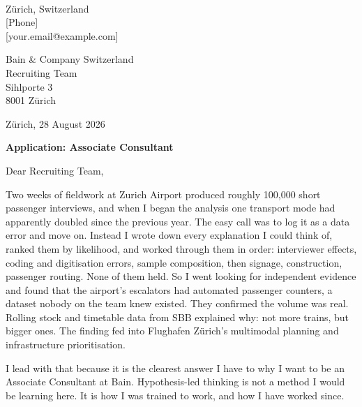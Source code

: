 \documentclass[10.5pt,a4paper]{article}
\begin{document}
\pagestyle{empty}


\begin{flushleft}
[First] [Last]\\
Zürich, Switzerland\\
{[Phone]}\\
{[your.email@example.com]}
\end{flushleft}

\begin{flushright}
Bain \& Company Switzerland\\
Recruiting Team\\
Sihlporte 3\\
8001 Zürich
\end{flushright}

Zürich, 28 August 2026

\vspace{0.15em}

\textbf{Application: Associate Consultant}

Dear Recruiting Team,

Two weeks of fieldwork at Zurich Airport produced roughly 100,000 short passenger interviews, and when I began the analysis one transport mode had apparently doubled since the previous year. The easy call was to log it as a data error and move on. Instead I wrote down every explanation I could think of, ranked them by likelihood, and worked through them in order: interviewer effects, coding and digitisation errors, sample composition, then signage, construction, passenger routing. None of them held. So I went looking for independent evidence and found that the airport's escalators had automated passenger counters, a dataset nobody on the team knew existed. They confirmed the volume was real. Rolling stock and timetable data from SBB explained why: not more trains, but bigger ones. The finding fed into Flughafen Zürich's multimodal planning and infrastructure prioritisation.

I lead with that because it is the clearest answer I have to why I want to be an Associate Consultant at Bain. Hypothesis-led thinking is not a method I would be learning here. It is how I was trained to work, and how I have worked since.
\end{document}
